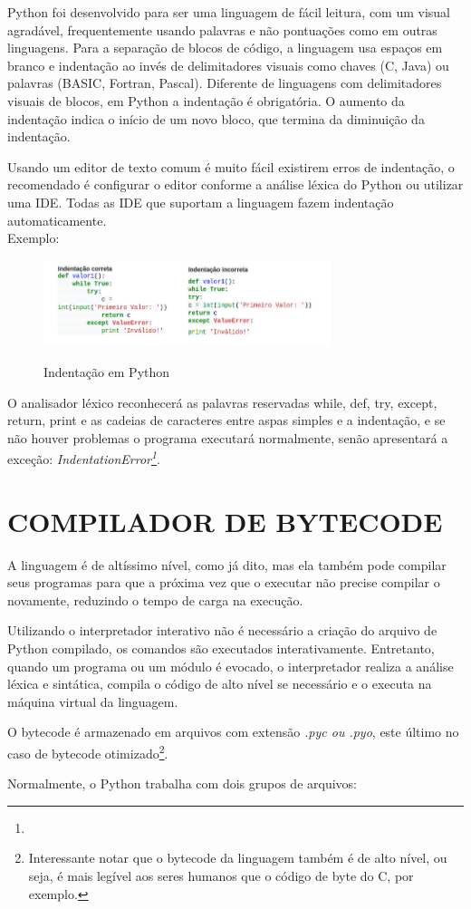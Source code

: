 Python foi desenvolvido para ser uma linguagem de fácil leitura, com um visual agradável, frequentemente usando palavras e não pontuações como em outras linguagens.
Para a separação de blocos de código, a linguagem usa espaços em branco e indentação ao invés de delimitadores visuais como chaves (C, Java) ou palavras (BASIC, Fortran, Pascal).
Diferente de linguagens com delimitadores visuais de blocos, em Python a indentação é obrigatória.
O aumento da indentação indica o início de um novo bloco, que termina da diminuição da indentação.
\par Usando um editor de texto comum é muito fácil existirem erros de indentação, o recomendado é configurar o editor conforme a análise léxica do Python ou utilizar uma IDE.
Todas as IDE que suportam a linguagem fazem indentação automaticamente.\\    
Exemplo:

\begin{figure}[!htb]
    \centering
    \caption{Indentação em Python}
    \includegraphics[width=0.75\textwidth]{./dados/figuras/ident2.png}
    \label{fig:figura-ident2-python}
\end{figure}

O analisador léxico reconhecerá as palavras reservadas while, def, try, except, return, print e as cadeias de caracteres entre aspas simples e a indentação, e se não houver problemas o programa executará normalmente, senão apresentará a exceção: \textit{IndentationError\footnote{
}}.

\section{COMPILADOR DE BYTECODE}
A linguagem é de altíssimo nível, como já dito, mas ela também pode compilar seus programas para que a próxima vez que o executar não precise compilar o novamente, reduzindo o tempo de carga na execução.
\par Utilizando o interpretador interativo não é necessário a criação do arquivo de Python compilado, os comandos são executados interativamente.
Entretanto, quando um programa ou um módulo é evocado, o interpretador realiza a análise léxica e sintática, compila o código de alto nível se necessário e o executa na máquina virtual da linguagem.
\par O bytecode é armazenado em arquivos com extensão \textit{.pyc ou .pyo}, este último no caso de bytecode otimizado\footnote{
    Interessante notar que o bytecode da linguagem também é de alto nível, ou seja, é mais legível aos seres humanos que o código de byte do C, por exemplo.}.
\par Normalmente, o Python trabalha com dois grupos de arquivos:

